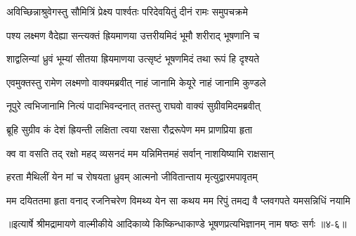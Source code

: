 \twolineshloka
{अविच्छिन्नाश्रुवेगस्तु सौमित्रिं प्रेक्ष्य पार्श्वतः}
{परिदेवयितुं दीनं रामः समुपचक्रमे} %

\twolineshloka
{पश्य लक्ष्मण वैदेह्या सन्त्यक्तं ह्रियमाणया}
{उत्तरीयमिदं भूमौ शरीराद् भूषणानि च} %

\twolineshloka
{शाद्वलिन्यां ध्रुवं भूम्यां सीतया ह्रियमाणया}
{उत्सृष्टं भूषणमिदं तथा रूपं हि दृश्यते} %

\twolineshloka
{एवमुक्तस्तु रामेण लक्ष्मणो वाक्यमब्रवीत्}
{नाहं जानामि केयूरे नाहं जानामि कुण्डले} %

\twolineshloka
{नूपुरे त्वभिजानामि नित्यं पादाभिवन्दनात्}
{ततस्तु राघवो वाक्यं सुग्रीवमिदमब्रवीत्} %

\twolineshloka
{ब्रूहि सुग्रीव कं देशं ह्रियन्ती लक्षिता त्वया}
{रक्षसा रौद्ररूपेण मम प्राणप्रिया हृता} %

\twolineshloka
{क्व वा वसति तद् रक्षो महद् व्यसनदं मम}
{यन्निमित्तमहं सर्वान् नाशयिष्यामि राक्षसान्} %

\twolineshloka
{हरता मैथिलीं येन मां च रोषयता ध्रुवम्}
{आत्मनो जीवितान्ताय मृत्युद्वारमपावृतम्} %

\twolineshloka
{मम दयिततमा हृता वनाद् रजनिचरेण विमथ्य येन सा}
{कथय मम रिपुं तमद्य वै प्लवगपते यमसन्निधिं नयामि} %


॥इत्यार्षे श्रीमद्रामायणे वाल्मीकीये आदिकाव्ये किष्किन्धाकाण्डे भूषणप्रत्यभिज्ञानम् नाम षष्ठः सर्गः ॥४-६॥
